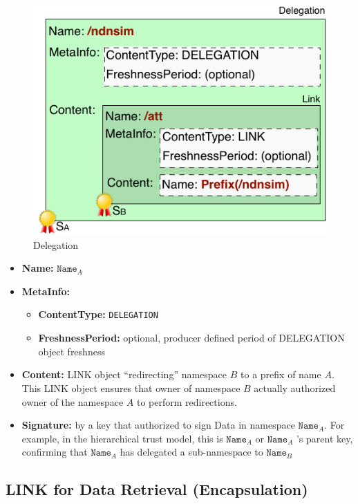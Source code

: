 \documentclass[10pt]{article}
\begin{document}
\begin{figure}[h]
  \centering
  \includegraphics[scale=0.8]{delegation}
  \caption{Delegation}
  \label{fig:delegation}
\end{figure}

\begin{itemize}
\item \textbf{Name:} $\mathtt{Name}_A$
\item \textbf{MetaInfo:}
  \begin{itemize}
  \item \textbf{ContentType:} \verb|DELEGATION|
  \item \textbf{FreshnessPeriod:} optional, producer defined period of DELEGATION object freshness
  \end{itemize}
\item \textbf{Content:} LINK object ``redirecting'' namespace $B$ to a prefix of name $A$.  This LINK object ensures that owner of namespace $B$ actually authorized owner of the namespace $A$ to perform redirections.
\item \textbf{Signature:} by a key that authorized to sign Data in namespace $\mathtt{Name}_A$.
  For example, in the hierarchical trust model, this is $\mathtt{Name}_A$ or $\mathtt{Name}_A$ 's parent key, confirming that $\mathtt{Name}_A$ has delegated a sub-namespace to $\mathtt{Name}_B$
\end{itemize}



\subsection{LINK for Data Retrieval (Encapsulation)}
\end{document}
